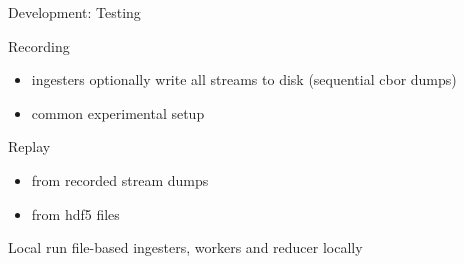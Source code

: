 \documentclass[aspectratio=169]{beamer}
\begin{document}
\begin{frame}{Development: Testing}
 \begin{block}{Recording}
 \begin{itemize}
  \item ingesters optionally write all streams to disk (sequential cbor dumps)
  \item common experimental setup
 \end{itemize}



 \end{block}

\begin{block}{Replay}
\begin{itemize}
 \item from recorded stream dumps
 \item from hdf5 files
\end{itemize}
\end{block}

\begin{block}{Local}
 run file-based ingesters, workers and reducer locally
\end{block}

\end{frame}
\end{document}
